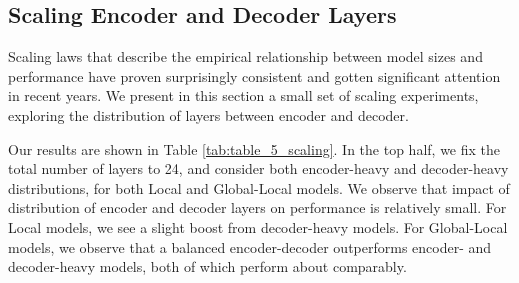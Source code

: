 \documentclass[11pt]{article}
\begin{document}
\subsection{Scaling Encoder and Decoder Layers}



Scaling laws \citep{kaplan2020scaling,ghorbani2021scaling,zhang2022examining} that describe the empirical relationship between model sizes and performance have proven surprisingly consistent and gotten significant attention in recent years.
We present in this section a small set of scaling experiments, exploring the distribution of layers between encoder and decoder. 

Our results are shown in Table \ref{tab:table_5_scaling}.
In the top half, we fix the total number of layers to 24, and consider both encoder-heavy and decoder-heavy distributions, for both Local and Global-Local models. 
We observe that impact of distribution of encoder and decoder layers on performance is relatively small.
For Local models, we see a slight boost from decoder-heavy models.
For Global-Local models, we observe that a balanced encoder-decoder outperforms encoder- and decoder-heavy models, both of which perform about comparably.
\end{document}

